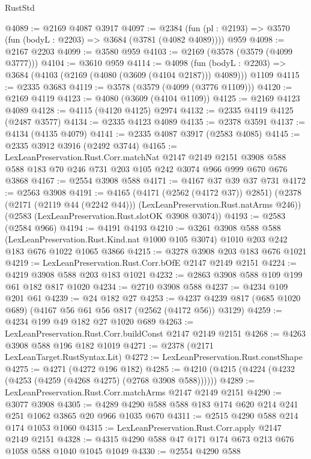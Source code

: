 \begin{lexlean}{RustStd}
\begin{coremodule}
{\begin{coremodule}
{{{{{{{{{{{{{{{@4089 := @2169 @4087 @3917
@4097 := @2384 (fun (pl : @2193) => @3570 (fun (bodyL : @2203) => @3684 (@3781 (@4082 @4089)))) @959
@4098 := @2167 @2203
@4099 := @3580 @959
@4103 := @2169 (@3578 (@3579 (@4099 @3777)))
@4104 := @3610 @959
@4114 := @4098
    (fun (bodyL : @2203) => @3684 (@4103 (@2169 (@4080 (@3609 (@4104 @2187))) @4089)))
    @1109
@4115 := @2335 @3683
@4119 := @3578 (@3579 (@4099 (@3776 @1109)))
@4120 := @2169 @4119
@4123 := @4080 (@3609 (@4104 @1109))
@4125 := @2169 @4123 @4089
@4128 := @4115 (@4120 @4125) @2974
@4132 := @2335 @4119 @4125 (@2487 @3577)
@4134 := @2335 @4123 @4089
@4135 := @2378 @3591
@4137 := @4134 (@4135 @4079)
@4141 := @2335 @4087 @3917 (@2583 @4085)
@4145 := @2335 @3912 @3916 (@2492 @3744)
@4165 := LexLeanPreservation.Rust.Corr.matchNat
    @2147
    @2149
    @2151
    @3908
    @588
    @588
    @183
    @70
    @246
    @731
    @203
    @105
    @242
    @3074
    @966
    @999
    @670
    @676
    @3868
@4167 := @2554 @3908 @588
@4171 := @4167 @37 @39 @37 @731
@4172 := @2563 @3908
@4191 := @4165
    (@4171 (@2562 (@4172 @37)) @2851)
    (@2378 (@2171 (@2119 @44 (@2242 @44))) (LexLeanPreservation.Rust.natArms @246))
    (@2583 (LexLeanPreservation.Rust.slotOK @3908 @3074))
@4193 := @2583 (@2584 @966)
@4194 := @4191 @4193
@4210 := @3261
    @3908
    @588
    @588
    (LexLeanPreservation.Rust.Kind.nat @1000 @105 @3074)
    @1010
    @203
    @242
    @183
    @676
    @1022
    @1065
    @3866
@4215 := @3278 @3908 @203 @183 @676 @1021
@4219 := LexLeanPreservation.Rust.Corr.bOfE @2147 @2149 @2151
@4224 := @4219 @3908 @588 @203 @183 @1021
@4232 := @2863 @3908 @588 @109 @199 @61 @182 @817 @1020
@4234 := @2710 @3908 @588
@4237 := @4234 @109 @201 @61
@4239 := @24 @182 @27
@4253 := @4237 @4239 @817 (@685 @1020 @689) (@4167 @56 @61 @56 @817 (@2562 (@4172 @56)) @3129)
@4259 := @4234 @199 @49 @182 @27 @1020 @689
@4263 := LexLeanPreservation.Rust.Corr.buildConst @2147 @2149 @2151
@4268 := @4263 @3908 @588 @196 @182 @1019
@4271 := @2378 (@2171 LexLeanTarget.RustSyntax.Lit)
@4272 := LexLeanPreservation.Rust.constShape
@4275 := @4271 (@4272 @196 @182)
@4285 := @4210 (@4215 (@4224 (@4232 (@4253 (@4259 (@4268 @4275) (@2768 @3908 @588))))))
@4289 := LexLeanPreservation.Rust.Corr.matchArms @2147 @2149 @2151
@4290 := @3077 @3908
@4305 := @4289 @4290 @588 @588 @183 @174 @620 @214 @241 @251 @1062 @3865 @20 @966 @1035 @670
@4311 := @2515 @4290 @588 @214 @174 @1053 @1060
@4315 := LexLeanPreservation.Rust.Corr.apply @2147 @2149 @2151
@4328 := @4315 @4290 @588 @47 @171 @174 @673 @213 @676 @1058 @588 @1040 @1045 @1049
@4330 := @2554 @4290 @588
}}}}}}}}}}}}}}}
\end{coremodule}}
\end{coremodule}
\end{lexlean}
